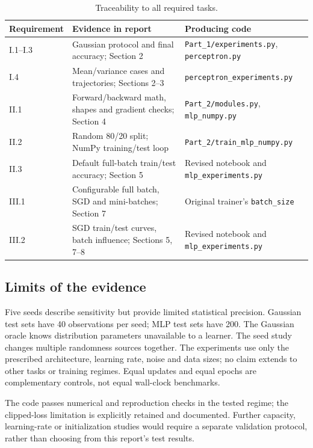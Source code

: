 \documentclass[10pt,a4paper]{article}
\newcommand{\code}[1]{\texttt{\small #1}}
\begin{document}
\begin{table}[H]\small\centering
\caption{Traceability to all required tasks.}
\begin{tabularx}{\linewidth}{@{}p{29mm}XX@{}}\toprule
Requirement & Evidence in report & Producing code\\\midrule
I.1--I.3 & Gaussian protocol and final accuracy; Section 2 & \code{Part\_1/experiments.py}, \code{perceptron.py}\\
I.4 & Mean/variance cases and trajectories; Sections 2--3 & \code{perceptron\_experiments.py}\\
II.1 & Forward/backward math, shapes and gradient checks; Section 4 & \code{Part\_2/modules.py}, \code{mlp\_numpy.py}\\
II.2 & Random 80/20 split; NumPy training/test loop & \code{Part\_2/train\_mlp\_numpy.py}\\
II.3 & Default full-batch train/test accuracy; Section 5 & Revised notebook and \code{mlp\_experiments.py}\\
III.1 & Configurable full batch, SGD and mini-batches; Section 7 & Original trainer's \code{batch\_size}\\
III.2 & SGD train/test curves, batch influence; Sections 5, 7--8 & Revised notebook and \code{mlp\_experiments.py}\\\bottomrule
\end{tabularx}\end{table}

\subsection{Limits of the evidence}
Five seeds describe sensitivity but provide limited statistical precision.
Gaussian test sets have 40 observations per seed; MLP test sets have 200.
The Gaussian oracle knows distribution parameters unavailable to a learner.
The seed study changes multiple randomness sources together. The experiments
use only the prescribed architecture, learning rate, noise and data sizes;
no claim extends to other tasks or training regimes. Equal updates and equal
epochs are complementary controls, not equal wall-clock benchmarks.

The code passes numerical and reproduction checks in the tested regime;
the clipped-loss limitation is explicitly retained and documented. Further
capacity, learning-rate or initialization studies would require a separate
validation protocol, rather than choosing from this report's test results.
\end{document}
